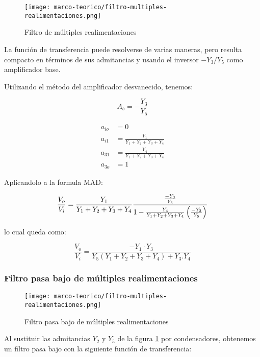 \begin{figure}[ht]
    \centering
    \texttt{[image: marco-teorico/filtro-multiples-realimentaciones.png]}
    \caption{Filtro de múltiples realimentaciones}
    \label{fig:filtro-multiples-realimentacion}
\end{figure}

La función de transferencia puede resolverse de varias maneras, pero resulta compacto en términos de sus admitancias y usando el inversor $-Y_3/Y_5$ como amplificador base.

Utilizando el método del amplificador desvanecido, tenemos:

$$A_b = - \frac{Y_3}{Y_5}$$

\begin{align*}
    a_{io} &= 0 \\
    a_{i1} &= \frac{Y_1}{Y_1 + Y_2 + Y_3 + Y_4}\\
    a_{31} &= \frac{Y_4}{Y_1 + Y_2 + Y_3 + Y_4}\\
    a_{3o} &= 1
\end{align*}

Aplicandolo a la formula MAD:

\begin{equation}
    \frac{V_o}{V_i} = \frac{Y_1}{Y_1 + Y_2 + Y_3 + Y_4} \frac{\frac{-Y_3}{Y_5}}{1 - \frac{Y_4}{Y_1 + Y_2 + Y_3 + Y_4} \left( \frac{-Y_3}{Y_5} \right)}
\end{equation}

lo cual queda como:

\begin{equation}
    \frac{V_o}{V_i} = \frac{-Y_1 \cdot Y_3}{Y_5(Y_1 + Y_2 + Y_3 + Y_4)+ Y_3.Y_4} 
    \label{eq:filtro-multirealimentacion}
\end{equation}

\subsubsection{Filtro pasa bajo de múltiples realimentaciones}

\begin{figure}[ht]
    \centering
    \texttt{[image: marco-teorico/filtro-multiples-realimentaciones.png]}
    \caption{Filtro pasa bajo de múltiples realimentaciones}
    \label{fig:filtro-multiples-realimentacion-pasa-bajo}
\end{figure}

Al sustituir las admitancias $Y_2$ y $Y_5$ de la figura \ref{fig:filtro-multiples-realimentacion} por condensadores, obtenemos un filtro pasa bajo con la siguiente función de transferencia:

